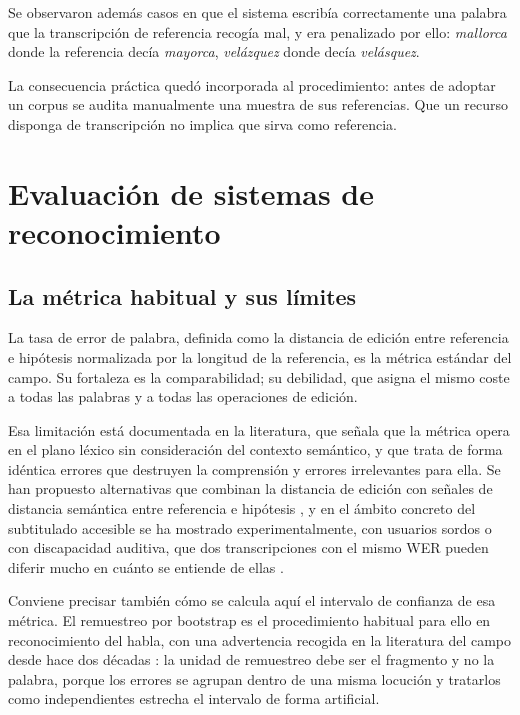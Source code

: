 Se observaron además casos en que el sistema escribía correctamente una palabra que la
transcripción de referencia recogía mal, y era penalizado por ello: \emph{mallorca} donde
la referencia decía \emph{mayorca}, \emph{velázquez} donde decía \emph{velásquez}.

La consecuencia práctica quedó incorporada al procedimiento: antes de adoptar un corpus se
audita manualmente una muestra de sus referencias. Que un recurso disponga de transcripción
no implica que sirva como referencia.

\section{Evaluación de sistemas de reconocimiento}

\subsection{La métrica habitual y sus límites}

La tasa de error de palabra, definida como la distancia de edición entre referencia e
hipótesis normalizada por la longitud de la referencia, es la métrica estándar del campo.
Su fortaleza es la comparabilidad; su debilidad, que asigna el mismo coste a todas las
palabras y a todas las operaciones de edición.

Esa limitación está documentada en la literatura, que señala que la métrica opera en el
plano léxico sin consideración del contexto semántico, y que trata de forma idéntica errores
que destruyen la comprensión y errores irrelevantes para ella. Se han propuesto alternativas
que combinan la distancia de edición con señales de distancia semántica entre referencia e
hipótesis \cite{kim2021semdist}, y en el ámbito concreto del subtitulado accesible se ha
mostrado experimentalmente, con usuarios sordos o con discapacidad auditiva, que dos
transcripciones con el mismo WER pueden diferir mucho en cuánto se entiende de
ellas \cite{kafle2017captions}.

Conviene precisar también cómo se calcula aquí el intervalo de confianza de esa métrica. El
remuestreo por bootstrap \cite{efron1993bootstrap} es el procedimiento habitual para ello en
reconocimiento del habla, con una advertencia recogida en la literatura del campo desde hace
dos décadas \cite{bisani2004bootstrap}: la unidad de remuestreo debe ser el fragmento
y no la palabra, porque los errores se agrupan dentro de una misma locución y tratarlos como
independientes estrecha el intervalo de forma artificial.

